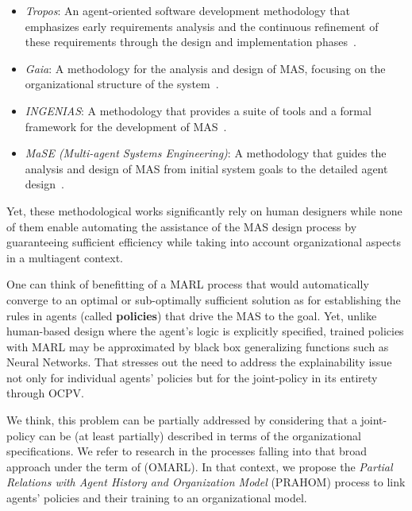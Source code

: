 \documentclass[runningheads]{llncs}
\begin{document}
\begin{itemize}
    \item \emph{Tropos}: An agent-oriented software development methodology that emphasizes early requirements analysis and the continuous refinement of these requirements through the design and implementation phases~\cite{Bresciani2004}.
    \item \emph{Gaia}: A methodology for the analysis and design of MAS, focusing on the organizational structure of the system~\cite{Zambonelli2003}.
    \item \emph{INGENIAS}: A methodology that provides a suite of tools and a formal framework for the development of MAS~\cite{Pavon2003}.
    \item \emph{MaSE (Multi-agent Systems Engineering)}: A methodology that guides the analysis and design of MAS from initial system goals to the detailed agent design~\cite{Scott2004}.
\end{itemize}

Yet, these methodological works significantly rely on human designers while none of them enable automating the assistance of the MAS design process by guaranteeing sufficient efficiency while taking into account organizational aspects in a multiagent context.

One can think of benefitting of a MARL process that would automatically converge to an optimal or sub-optimally sufficient solution as for establishing the rules in agents (called \textbf{policies}) that drive the MAS to the goal. Yet, unlike human-based design where the agent's logic is explicitly specified, trained policies with MARL may be approximated by black box generalizing functions such as Neural Networks. That stresses out the need to address the explainability issue not only for individual agents' policies but for the joint-policy in its entirety through OCPV.

We think, this problem can be partially addressed by considering that a joint-policy can be (at least partially) described in terms of the organizational specifications.
We refer to research in the processes falling into that broad approach under the term of  (OMARL).
In that context, we propose the \emph{Partial Relations with Agent History and Organization Model} (PRAHOM) process to link agents' policies and their training to an organizational model.
\end{document}
